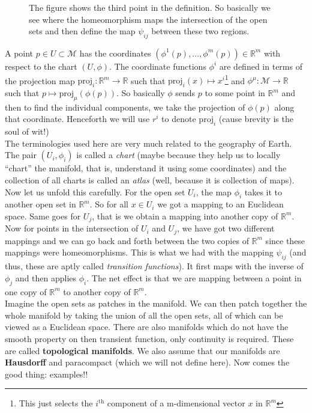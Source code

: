 \begin{figure}[H]
  \centering 
  
  \caption{The figure shows the third point in the definition. So basically we see where the homeomorphism maps the intersection of the open sets and then define the map $\psi_{ij}$ between these two regions.}
\end{figure}
A point $p \in U \subset \mathcal{M}$ has the coordinates $(\phi^1(p),\ldots, \phi^m(p) )\in \mathbb{R}^m$ with respect to the chart $(U,\phi)$. The coordinate functions $\phi^i$ are defined in terms of the projection map $\mathrm{proj}_i:\mathbb{R}^m \longrightarrow \mathbb{R}$ such that $\mathrm{proj}_i(x) \mapsto x^i$\footnote{This just selects the $i^{\text{th}}$ component of a m-dimensional vector $x$ in $\mathbb{R}^m$} and $\phi^\mu: \mathcal{M}\rightarrow \mathbb{R}$ such that $p \mapsto \mathrm{proj}_\mu(\phi(p))$. So basically $\phi$ sends $p$ to some point in $\mathbb{R}^m$ and then to find the individual components, we take the projection of $\phi(p)$ along that coordinate. Henceforth we will use $r^i$ to denote $\mathrm{proj}_i$ (cause brevity is the soul of wit!)\\[0.3cm]
The terminologies used here are very much related to the geography of Earth. The pair $(U_i, \phi_i)$ is called a \textit{chart} (maybe because they help us to locally ``chart'' the manifold, that is, understand it using some coordinates) and the collection of all charts is called an \textit{atlas} (well, because it is collection of maps). \\[0.3cm]
Now let us unfold this carefully. For the open set $U_i$, the map $\phi_i$ takes it to another open set in $\mathbb{R}^m$. So for all $x\in U_i$ we got a mapping to an Euclidean space. Same goes for $U_j$, that is we obtain a mapping into another copy of $\mathbb{R}^m$. Now for points in the intersection of $U_i$ and $U_j$, we have got two different mappings and we can go back and forth between the two copies of $\mathbb{R}^m$ since these mappings were homeomorphisms. This is what we had with the mapping $\psi_{ij}$ (and thus, these are aptly called \textit{transition functions}). It first maps with the inverse of $\phi_j$  and then applies $\phi_i$. The net effect is that we are mapping between a point in one copy of $\mathbb{R}^m$ to another copy of $\mathbb{R}^m$. \\[0.3cm]
Imagine the open sets as patches in the manifold. We can then patch together the whole manifold by taking the union of all the open sets, all of which can be viewed as a Euclidean space. There are also manifolds which do not have the smooth property on then transient function, only continuity is required. These are called \textbf{topological manifolds}. We also assume that our manifolds are \textbf{Hausdorff} and paracompact (which we will not define here). Now comes the good thing: examples!!
